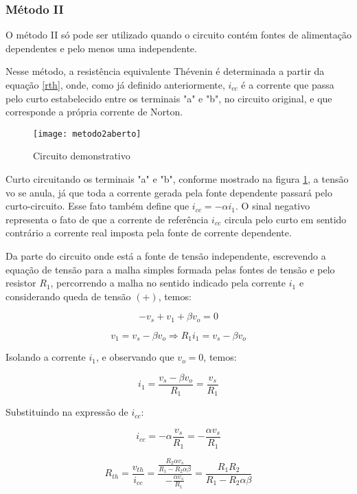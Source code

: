 \documentclass[12pt,fleqn]{book} %
\begin{document}
        \subsubsection{Método II}{
        
\begin{remark}
O método II só pode ser utilizado quando o circuito contém  fontes de alimentação dependentes e pelo menos uma independente.
\end{remark}

Nesse método, a resistência equivalente Thévenin é determinada a partir da equação \ref{rth}, onde, como já definido anteriormente, $i_{cc}$ é a corrente que passa pelo curto estabelecido entre os terminais "a" e "b", no circuito original, e que corresponde a própria corrente de Norton.

        \begin{figure}[!htbp] \centering\texttt{[image: metodo2aberto]}
            \caption{Circuito demonstrativo}\label{metodo2aberto} 
        \end{figure}

Curto circuitando os terminais "a" e "b", conforme mostrado na figura \ref{metodo2aberto}, a tensão vo se anula, já que toda a corrente gerada pela fonte dependente passará pelo curto-circuito. Esse fato também define que $i_{cc}=-\alpha i_1$. O sinal negativo representa o fato de que a corrente de referência $i_{cc}$ circula pelo curto em sentido contrário a corrente real imposta pela fonte de corrente dependente.

Da parte do circuito onde está a fonte de tensão independente, escrevendo a equação de tensão para a malha simples formada pelas fontes de tensão e pelo resistor $R_1$, percorrendo a malha no sentido indicado pela corrente $i_1$ e considerando queda de tensão $(+)$, temos:

\begin{equation}
-v_s+v_1+\beta v_o=0
\end{equation}

\begin{equation}
v_1=v_s-\beta v_o \Rightarrow R_1 i_1=v_s-\beta v_o
\end{equation}

Isolando a corrente $i_1$, e observando que $v_o=0$, temos:

\begin{equation}
i_1=\frac{v_s-\beta v_o}{R_1} = \frac{v_s}{R_1} 
\end{equation}

Substituindo na expressão de $i_{cc}$:

\begin{equation}
i_{cc}=-\alpha\frac{v_s}{R_1}=-\frac{\alpha v_s}{R_1} 
\end{equation}

\begin{equation}
R_{th}=\frac{v_{th}}{i_{cc}} =\frac{\frac{R_2\alpha v_s}{R_1-R_2\alpha\beta}}{-\frac{\alpha v_s}{R_1}} = \frac{R_1 R_2}{R_1-R_2 \alpha\beta}
\end{equation}
}
\end{document}
